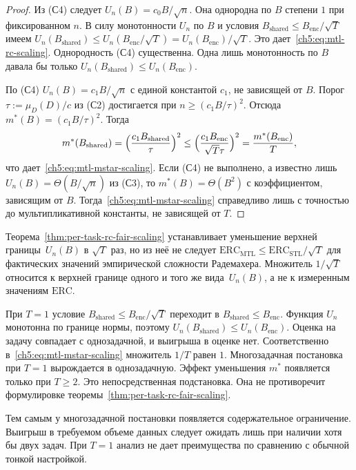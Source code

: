 \begin{proof}
Из (С4) следует $U_n(B)=c_0B/\sqrt{n}$.
Она однородна по $B$ степени $1$ при фиксированном $n$.
В силу монотонности $U_n$ по $B$ и условия $B_{\mathrm{shared}}\le B_{\mathrm{enc}}/\sqrt{T}$ имеем $U_n(B_{\mathrm{shared}})\le U_n(B_{\mathrm{enc}}/\sqrt{T})=U_n(B_{\mathrm{enc}})/\sqrt{T}$.
Это дает~\eqref{ch5:eq:mtl-rc-scaling}.
Однородность (С4) существенна.
Одна лишь монотонность по $B$ давала бы только $U_n(B_{\mathrm{shared}})\le U_n(B_{\mathrm{enc}})$.

По (С4) $U_n(B)=c_1B/\sqrt{n}$ с единой константой $c_1$, не зависящей от $B$.
Порог $\tau:=\mu_D(D)/c$ из (С2) достигается при $n\ge(c_1B/\tau)^2$.
Отсюда $m^*(B)=(c_1B/\tau)^2$.
Тогда
\[
  m^*(B_{\mathrm{shared}})=\Bigl(\frac{c_1B_{\mathrm{shared}}}{\tau}\Bigr)^2
  \le\Bigl(\frac{c_1B_{\mathrm{enc}}}{\sqrt{T}\tau}\Bigr)^2
  =\frac{m^*(B_{\mathrm{enc}})}{T},
\]
что дает~\eqref{ch5:eq:mtl-mstar-scaling}.
Если (С4) не выполнено, а известно лишь $U_n(B)=\Theta(B/\sqrt{n})$ из (С3), то $m^*(B)=\Theta(B^2)$ с коэффициентом, зависящим от $B$.
Тогда~\eqref{ch5:eq:mtl-mstar-scaling} справедливо лишь с точностью до мультипликативной константы, не зависящей от $T$. \end{proof}

\begin{remark}
Теорема~\ref{thm:per-task-rc-fair-scaling} устанавливает уменьшение верхней границы~$U_n(B)$ в $\sqrt{T}$ раз, но из неё не следует $\mathrm{ERC}_{\mathrm{MTL}}\le\mathrm{ERC}_{\mathrm{STL}}/\sqrt{T}$ для фактических значений эмпирической сложности Радемахера.
Множитель $1/\sqrt{T}$ относится к верхней границе одного и того же вида~$U_n(B)$, а не к измеренным значениям $\mathrm{ERC}$.
\end{remark}

\begin{remark}\label{ch5:rem:mtl-t1}
При $T=1$ условие $B_{\mathrm{shared}}\le B_{\mathrm{enc}}/\sqrt{T}$ переходит в $B_{\mathrm{shared}}\le B_{\mathrm{enc}}$.
Функция $U_n$ монотонна по границе нормы, поэтому $U_n(B_{\mathrm{shared}})\le U_n(B_{\mathrm{enc}})$.
Оценка на задачу совпадает с однозадачной, и выигрыша в оценке нет.
Соответственно в~\eqref{ch5:eq:mtl-mstar-scaling} множитель $1/T$ равен $1$.
Многозадачная постановка при $T=1$ вырождается в однозадачную.
Эффект уменьшения $m^*$ появляется только при $T\ge 2$.
Это непосредственная подстановка.
Она не противоречит формулировке теоремы~\ref{thm:per-task-rc-fair-scaling}.

Тем самым у многозадачной постановки появляется содержательное ограничение.
Выигрыш в требуемом объеме данных следует ожидать лишь при наличии хотя бы двух задач.
При $T=1$ анализ не дает преимущества по сравнению с обычной тонкой настройкой.
\end{remark}

